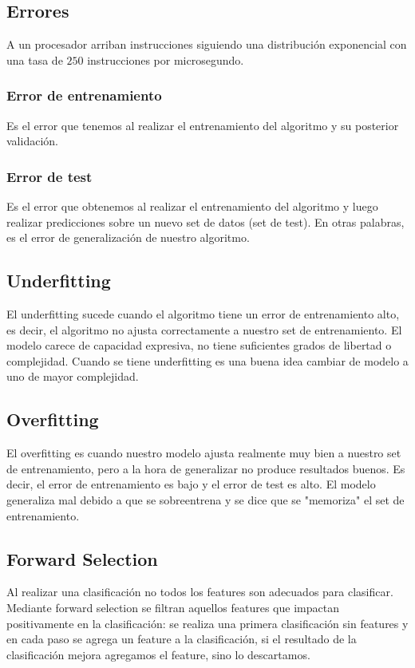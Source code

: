 \documentclass[12pt]{article}
\begin{document}
\subsection{Errores}
A un procesador arriban instrucciones siguiendo una distribución exponencial con una tasa de $250$ instrucciones por microsegundo.

\subsubsection{Error de entrenamiento}
Es el error que tenemos al realizar el entrenamiento del algoritmo y su posterior validación.

\subsubsection{Error de test}
Es el error que obtenemos al realizar el entrenamiento del algoritmo y luego realizar predicciones sobre un nuevo set de datos (set de test).
En otras palabras, es el error de generalización de nuestro algoritmo.


\subsection{Underfitting}
El underfitting sucede cuando el algoritmo tiene un error de entrenamiento alto, es decir, el algoritmo no ajusta correctamente a nuestro set de entrenamiento.
El modelo carece de capacidad expresiva, no tiene suficientes grados de libertad o complejidad.
Cuando se tiene underfitting es una buena idea cambiar de modelo a uno de mayor complejidad.


\subsection{Overfitting}
El overfitting es cuando nuestro modelo ajusta realmente muy bien a nuestro set de entrenamiento, pero a la hora de generalizar no produce resultados buenos. Es decir, el error de entrenamiento es bajo y el error de test es alto.
El modelo generaliza mal debido a que se sobreentrena y se dice que se "memoriza" el set de entrenamiento.


\subsection{Forward Selection}
Al realizar una clasificación no todos los features son adecuados para clasificar. Mediante forward selection se filtran aquellos features que impactan positivamente en la clasificación: se realiza una primera clasificación sin features y en cada paso se agrega un feature a la clasificación, si el resultado de la clasificación mejora agregamos el feature, sino lo descartamos.
\end{document}

